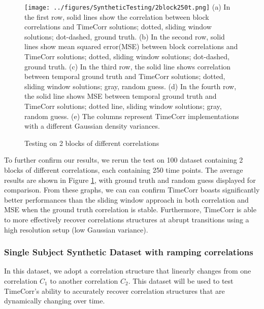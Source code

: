 \documentclass[11pt]{article}
\begin{document}
\begin{figure}[!htb]
\caption{Testing on 2 blocks of different correlations}
\texttt{[image: ../figures/SyntheticTesting/2block250t.png]}
\label{fig:2block250t}
(a) In the first row, solid lines show the correlation between block correlations and TimeCorr solutions; dotted, sliding window solutions; dot-dashed, ground truth. (b) In the second row, solid lines show mean squared error(MSE) between block correlations and TimeCorr solutions; dotted, sliding window solutions; dot-dashed, ground truth. (c) In the third row, the solid line shows correlation between temporal ground truth and TimeCorr solutions; dotted, sliding window solutions; gray, random guess. (d) In the fourth row, the solid line shows MSE between temporal ground truth and TimeCorr solutions; dotted line, sliding window solutions; gray, random guess. (e) The columns represent TimeCorr implementations with a different Gaussian density variances.
\end{figure}

To further confirm our results, we rerun the test on 100 dataset containing 2 blocks of different correlations, each containing 250 time points. The average results are shown in Figure \ref{fig:2block250t}, with ground truth and random guess displayed for comparison. From these graphs, we can can confirm TimeCorr boasts significantly better performances than the sliding window approach in both correlation and MSE when the ground truth correlation is stable. Furthermore, TimeCorr is able to more effectively recover correlations structures at abrupt transitions using a high resolution setup (low Gaussian variance).

\subsubsection{Single Subject Synthetic Dataset with ramping correlations}

In this dataset, we adopt a correlation structure that linearly changes from one correlation $C_1$ to another correlation $C_2$. This dataset will be used to test TimeCorr's ability to accurately recover correlation structures that are dynamically changing over time.
\end{document}
